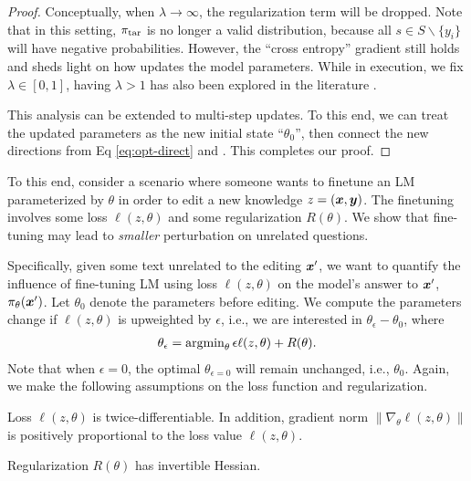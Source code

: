 \begin{proof}
Conceptually, when $\lambda \rightarrow \infty$, the regularization term will be dropped. Note that in this setting, $\pi_\text{tar}$ is no longer a valid distribution, because all $s \in S \backslash \{y_i\}$ will have negative probabilities. However, the ``cross entropy'' gradient still holds and sheds light on how {\NAME} updates the model parameters. While in execution, we fix $\lambda \in [0, 1]$, having $\lambda > 1$ has also been explored in the literature \citep{}.


This analysis can be extended to multi-step updates. To this end, we can treat the updated parameters as the new initial state ``$\theta_0$'', then connect the new directions from Eq \eqref{eq:opt-direct} and {\NAME}.
This completes our proof. 
\end{proof}



To this end, 
consider a scenario where someone wants to finetune an LM parameterized by $\theta$ in order to edit a new knowledge $z = (\boldsymbol{x}, \boldsymbol{y})$. 
The finetuning involves some loss $\ell (z, \theta)$ and some regularization $R(\theta)$. 
We show that fine-tuning {\NAME} may lead to \textit{smaller} perturbation on unrelated questions. 

Specifically, 
given some text unrelated to the editing $\boldsymbol{x}'$, 
we want to quantify the influence of fine-tuning LM using loss $\ell (z, \theta)$ on the model's answer to $\boldsymbol{x}'$, $\pi_\theta(\boldsymbol{x}')$.
Let $\theta_0$ denote the parameters before editing. 
We compute the parameters change if $\ell(z, \theta)$ is upweighted by $\epsilon$, i.e., 
we are interested in $\theta_\epsilon - \theta_0$, where 
% 
\begin{align*}
\theta_\epsilon = \operatorname{argmin}_\theta \epsilon \ell(z, \theta) + R(\theta).
\end{align*}
% 
Note that when $\epsilon = 0$, the optimal $\theta_{\epsilon = 0}$ will remain unchanged, i.e., $\theta_0$. 
Again, we make the following assumptions on the loss function and regularization. 
% 
\begin{assumption}
\label{asmp:loss-2}
Loss $\ell(z, \theta)$ is twice-differentiable. 
In addition, gradient norm $\| \nabla_\theta \ell(z, \theta) \|$ is positively proportional to the loss value $\ell(z, \theta)$. 
\end{assumption}

\begin{assumption}
\label{asmp:reg}
Regularization $R(\theta)$ has invertible Hessian. 
\end{assumption}

